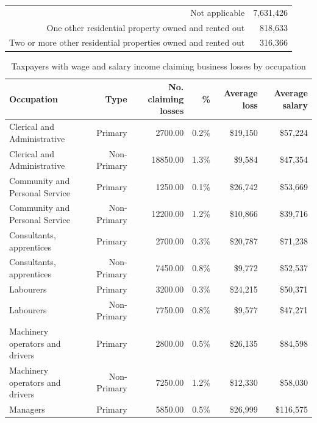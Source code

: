 \documentclass{grattan}\usepackage[]{graphicx}\usepackage[]{color}
\begin{document}
\begin{table}
\begin{tabular}{rr}
  \toprule
  \midrule
Not applicable & 7,631,426 \\ 
  One other residential
property owned and rented out & 818,633 \\ 
  Two or more other residential
properties owned and rented out & 316,366 \\ 
   \bottomrule
\end{tabular}

\end{table}

\begin{table}
\caption{Taxpayers with wage and salary income claiming business losses by occupation}\label{tbl:bizlosses}
\begin{tabular}{lrrrrr}
  \toprule
{\textbf{Occupation}} & {\textbf{Type}} & {\textbf{No. claiming losses}} & {\textbf{\%}} & {\textbf{Average loss}} & {\textbf{Average salary}} \\ 
  \midrule
Clerical and Administrative & Primary & 2700.00 & 0.2\% & \$19,150 & \$57,224 \\ 
  Clerical and Administrative & Non-Primary & 18850.00 & 1.3\% & \$9,584 & \$47,354 \\ 
   [6pt]Community and Personal Service & Primary & 1250.00 & 0.1\% & \$26,742 & \$53,669 \\ 
  Community and Personal Service & Non-Primary & 12200.00 & 1.2\% & \$10,866 & \$39,716 \\ 
   [6pt]Consultants, apprentices & Primary & 2700.00 & 0.3\% & \$20,787 & \$71,238 \\ 
  Consultants, apprentices & Non-Primary & 7450.00 & 0.8\% & \$9,772 & \$52,537 \\ 
   [6pt]Labourers & Primary & 3200.00 & 0.3\% & \$24,215 & \$50,371 \\ 
  Labourers & Non-Primary & 7750.00 & 0.8\% & \$9,577 & \$47,271 \\ 
   [6pt]Machinery operators and drivers & Primary & 2800.00 & 0.5\% & \$26,135 & \$84,598 \\ 
  Machinery operators and drivers & Non-Primary & 7250.00 & 1.2\% & \$12,330 & \$58,030 \\ 
   [6pt]Managers & Primary & 5850.00 & 0.5\% & \$26,999 & \$116,575 \\ 

\end{tabular}
\end{table}
\end{document}

